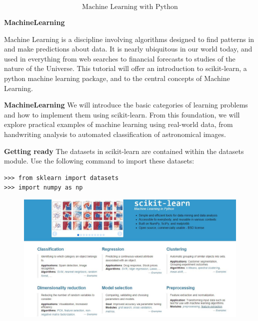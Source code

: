 \documentclass[MASTER.tex]{subfiles}
\begin{document}
 
	
	
	\begin{frame}
		\huge
		\[ \mbox{Machine Learning with Python} \]
	\end{frame}
	
\begin{frame}
\Large
\textbf{MachineLearning}

Machine Learning is a discipline involving algorithms designed to find patterns in and make predictions about data. It is nearly ubiquitous in our world today, and used in everything from web searches to financial forecasts to studies of the nature of the Universe. This tutorial will offer an introduction to scikit-learn, a python machine learning package, and to the central concepts of Machine Learning. 

\end{frame}
\begin{frame}
\Large	\textbf{MachineLearning}
	We will introduce the basic categories of learning problems and how to implement them using scikit-learn. From this foundation, we will explore practical examples of machine learning using real-world data, from handwriting analysis to automated classification of astronomical images.

\end{frame}
\begin{frame}[fragile]
\textbf{Getting ready}
The datasets in scikit-learn are contained within the datasets module. Use the following
command to import these datasets:
\begin{framed}
\begin{verbatim}
>>> from sklearn import datasets
>>> import numpy as np
\end{verbatim}
\end{framed}

\end{frame}
\begin{frame}
	\begin{figure}
\centering
\includegraphics[width=1.2\linewidth]{SKLsite}

\end{figure}

\end{frame}
\end{document}
